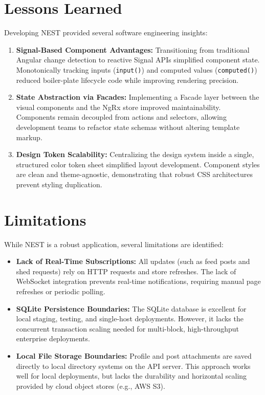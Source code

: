 \section{Lessons Learned}
Developing NEST provided several software engineering insights:
\begin{enumerate}
    \item \textbf{Signal-Based Component Advantages:} Transitioning from traditional Angular change detection to reactive Signal APIs simplified component state. Monotonically tracking inputs (\texttt{input()}) and computed values (\texttt{computed()}) reduced boiler-plate lifecycle code while improving rendering precision.
    \item \textbf{State Abstraction via Facades:} Implementing a Facade layer between the visual components and the NgRx store improved maintainability. Components remain decoupled from actions and selectors, allowing development teams to refactor state schemas without altering template markup.
    \item \textbf{Design Token Scalability:} Centralizing the design system inside a single, structured color token sheet simplified layout development. Component styles are clean and theme-agnostic, demonstrating that robust CSS architectures prevent styling duplication.
\end{enumerate}

\section{Limitations}
While NEST is a robust application, several limitations are identified:
\begin{itemize}
    \item \textbf{Lack of Real-Time Subscriptions:} All updates (such as feed posts and shed requests) rely on HTTP requests and store refreshes. The lack of WebSocket integration prevents real-time notifications, requiring manual page refreshes or periodic polling.
    \item \textbf{SQLite Persistence Boundaries:} The SQLite database is excellent for local staging, testing, and single-host deployments. However, it lacks the concurrent transaction scaling needed for multi-block, high-throughput enterprise deployments.
    \item \textbf{Local File Storage Boundaries:} Profile and post attachments are saved directly to local directory systems on the API server. This approach works well for local deployments, but lacks the durability and horizontal scaling provided by cloud object stores (e.g., AWS S3).
\end{itemize}

